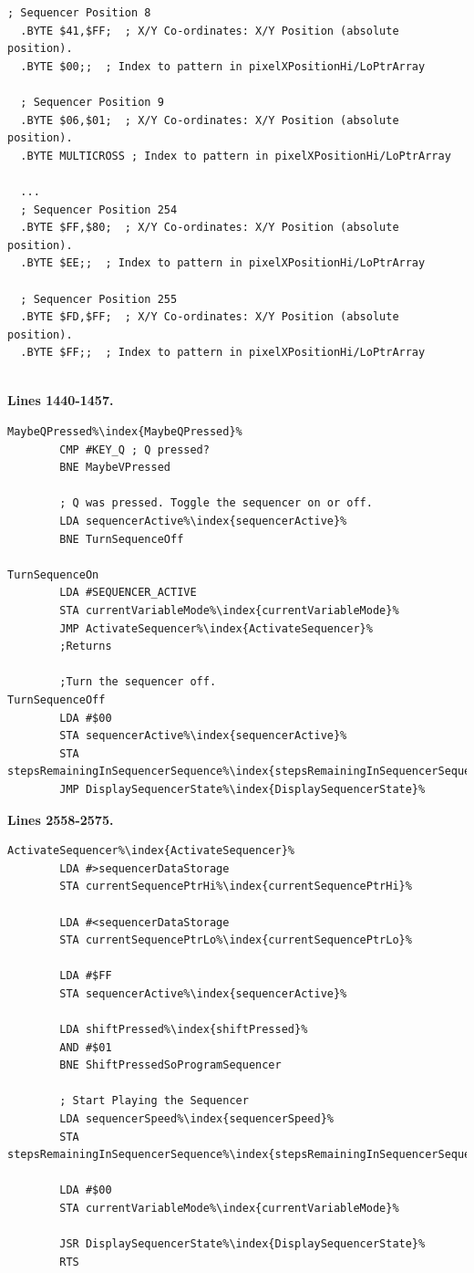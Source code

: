 \begin{lstlisting}[basicstyle=\ttfamily\scriptsize,caption=Sequencer definition in \icode{sequencer\_data.asm}.,escapechar=\%]
  ; Sequencer Position 8
  .BYTE $41,$FF;  ; X/Y Co-ordinates: X/Y Position (absolute position).   
  .BYTE $00;;  ; Index to pattern in pixelXPositionHi/LoPtrArray   

  ; Sequencer Position 9
  .BYTE $06,$01;  ; X/Y Co-ordinates: X/Y Position (absolute position).   
  .BYTE MULTICROSS ; Index to pattern in pixelXPositionHi/LoPtrArray   

  ...
  ; Sequencer Position 254
  .BYTE $FF,$80;  ; X/Y Co-ordinates: X/Y Position (absolute position).   
  .BYTE $EE;;  ; Index to pattern in pixelXPositionHi/LoPtrArray   

  ; Sequencer Position 255
  .BYTE $FD,$FF;  ; X/Y Co-ordinates: X/Y Position (absolute position).   
  .BYTE $FF;;  ; Index to pattern in pixelXPositionHi/LoPtrArray   
    
\end{lstlisting}

\clearpage
\textbf{Lines 1440-1457. }
\begin{lstlisting}[escapechar=\%]
MaybeQPressed%\index{MaybeQPressed}%    
        CMP #KEY_Q ; Q pressed?
        BNE MaybeVPressed

        ; Q was pressed. Toggle the sequencer on or off.
        LDA sequencerActive%\index{sequencerActive}%
        BNE TurnSequenceOff

TurnSequenceOn
        LDA #SEQUENCER_ACTIVE
        STA currentVariableMode%\index{currentVariableMode}%
        JMP ActivateSequencer%\index{ActivateSequencer}%
        ;Returns

        ;Turn the sequencer off.
TurnSequenceOff   
        LDA #$00
        STA sequencerActive%\index{sequencerActive}%
        STA stepsRemainingInSequencerSequence%\index{stepsRemainingInSequencerSequence}%
        JMP DisplaySequencerState%\index{DisplaySequencerState}%
\end{lstlisting}
\textbf{Lines 2558-2575. }
\begin{lstlisting}[escapechar=\%]
ActivateSequencer%\index{ActivateSequencer}% 
        LDA #>sequencerDataStorage
        STA currentSequencePtrHi%\index{currentSequencePtrHi}%

        LDA #<sequencerDataStorage
        STA currentSequencePtrLo%\index{currentSequencePtrLo}%

        LDA #$FF
        STA sequencerActive%\index{sequencerActive}%

        LDA shiftPressed%\index{shiftPressed}%
        AND #$01
        BNE ShiftPressedSoProgramSequencer

        ; Start Playing the Sequencer
        LDA sequencerSpeed%\index{sequencerSpeed}%
        STA stepsRemainingInSequencerSequence%\index{stepsRemainingInSequencerSequence}%

        LDA #$00
        STA currentVariableMode%\index{currentVariableMode}%

        JSR DisplaySequencerState%\index{DisplaySequencerState}%
        RTS 
\end{lstlisting}
\clearpage

